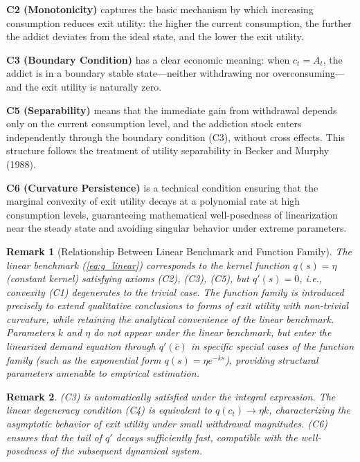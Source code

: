 \documentclass[12pt]{article}
\newtheorem{remark}{Remark}
\begin{document}
\textbf{C2 (Monotonicity)} captures the basic mechanism by which increasing consumption reduces exit utility: the higher the current consumption,
the further the addict deviates from the ideal state, and the lower the exit utility.
 
\textbf{C3 (Boundary Condition)} has a clear economic meaning: when $c_t = A_t$, the addict
is in a boundary stable state---neither withdrawing nor overconsuming---and the exit utility is naturally zero.
 
\textbf{C5 (Separability)} means that the immediate gain from withdrawal depends only on the current consumption level, and the
addiction stock enters independently through the boundary condition (C3), without cross effects. This structure follows the treatment of utility separability in
Becker and Murphy (1988).
 
\textbf{C6 (Curvature Persistence)} is a technical condition ensuring that the marginal convexity of exit utility decays at a polynomial rate at high consumption levels, guaranteeing mathematical well-posedness of linearization near the steady state and avoiding singular behavior under extreme parameters.
 
\begin{remark}[Relationship Between Linear Benchmark and Function Family]
The linear benchmark (\ref{eq:g_linear}) corresponds to the kernel function $q(s) = \eta$ (constant kernel)
satisfying axioms (C2), (C3), (C5), but $q'(s) = 0$, i.e., convexity (C1) degenerates to the trivial case.
The function family is introduced precisely to extend qualitative conclusions to forms of exit utility with non-trivial curvature,
while retaining the analytical convenience of the linear benchmark.
Parameters $k$ and $\eta$ do not appear under the linear benchmark, but enter the linearized demand equation through $q'(\bar{c})$ in specific special cases of the function family
(such as the exponential form $q(s)=\eta e^{-ks}$),
providing structural parameters amenable to empirical estimation.
\end{remark}

\begin{remark}
    (C3) is automatically satisfied under the integral expression. The linear degeneracy condition (C4)
    is equivalent to $q(c_t) \to \eta k$, characterizing the asymptotic behavior of exit utility under small withdrawal magnitudes.
    (C6) ensures that the tail of $q'$ decays sufficiently fast, compatible with the well-posedness of the subsequent dynamical system.
\end{remark}
 
\end{document}
